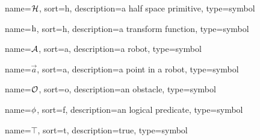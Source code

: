 	{%
		name=\ensuremath{\set{H}},
		sort=h,
		description=a half space primitive,
		type=symbol
	}
	\newcommand{\halfspaceprimitive}{\gls{sym:halfspaceprimitive}}

	{%
		name=\ensuremath{\func{h}},
		sort=h,
		description=a transform function,
		type=symbol
	}
	\newcommand{\transform}{\gls{sym:transform}}

	{%
		name=\ensuremath{\set{A}},
		sort=a,
		description=a robot,
		type=symbol
	}
	\newcommand{\robot}{\gls{sym:robot}}

	{%
		name=\ensuremath{\vec{a}},
		sort=a,
		description=a point in a robot,
		type=symbol
	}
	\newcommand{\pointinrobot}{\gls{sym:pointinrobot}}

	{%
		name=\ensuremath{\set{O}},
		sort=o,
		description=an obstacle,
		type=symbol
	}
	\newcommand{\obstacle}{\gls{sym:obstacle}}

	{%
		name=\ensuremath{\func{\phi}},
		sort=f,
		description=an logical predicate,
		type=symbol
	}
	\newcommand{\logicalpredicate}{\gls{sym:logicalpredicate}}

	{%
		name=\ensuremath{\top},
		sort=t,
		description=true,
		type=symbol
	}
	\newcommand{\true}{\gls{sym:true}}

